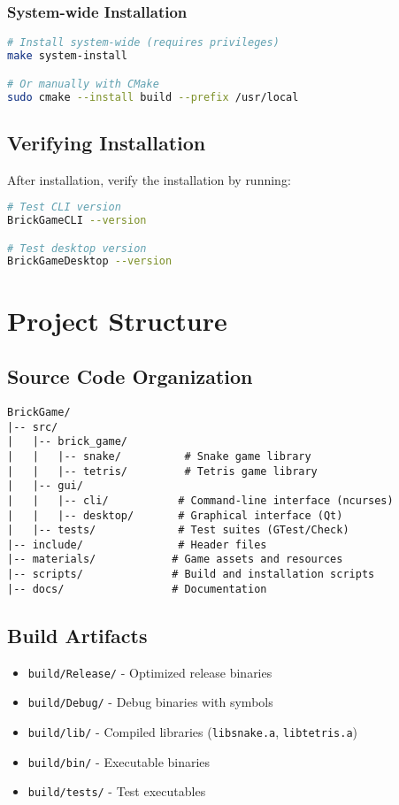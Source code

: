 \documentclass[12pt]{article}
\begin{document}
\subsubsection{System-wide Installation}
\begin{lstlisting}[language=bash]
# Install system-wide (requires privileges)
make system-install

# Or manually with CMake
sudo cmake --install build --prefix /usr/local
\end{lstlisting}

\subsection{Verifying Installation}
After installation, verify the installation by running:
\begin{lstlisting}[language=bash]
# Test CLI version
BrickGameCLI --version

# Test desktop version  
BrickGameDesktop --version
\end{lstlisting}

\section{Project Structure}

\subsection{Source Code Organization}
\begin{lstlisting}[basicstyle=\ttfamily\small]
BrickGame/
|-- src/
|   |-- brick_game/
|   |   |-- snake/          # Snake game library
|   |   |-- tetris/         # Tetris game library
|   |-- gui/
|   |   |-- cli/           # Command-line interface (ncurses)
|   |   |-- desktop/       # Graphical interface (Qt)
|   |-- tests/             # Test suites (GTest/Check)
|-- include/               # Header files
|-- materials/            # Game assets and resources
|-- scripts/              # Build and installation scripts
|-- docs/                 # Documentation
\end{lstlisting}

\subsection{Build Artifacts}
\begin{itemize}
    \item \texttt{build/Release/} - Optimized release binaries
    \item \texttt{build/Debug/} - Debug binaries with symbols
    \item \texttt{build/lib/} - Compiled libraries (\texttt{libsnake.a}, \texttt{libtetris.a})
    \item \texttt{build/bin/} - Executable binaries
    \item \texttt{build/tests/} - Test executables
\end{itemize}
\end{document}
